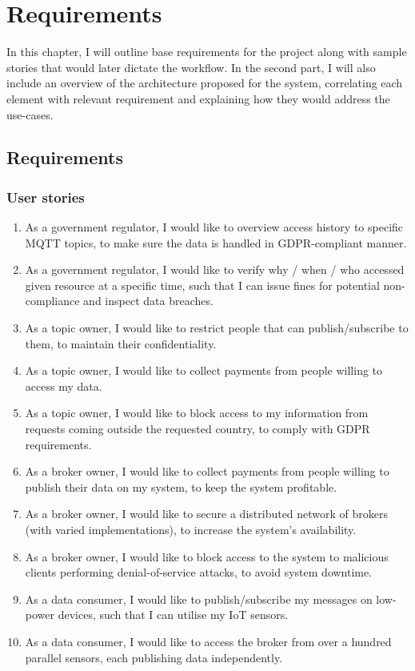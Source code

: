 \chapter{Requirements}
In this chapter, I will outline base requirements for the project along with sample stories that would later dictate the workflow. In the second part, I will also include an overview of the architecture proposed for the system, correlating each element with relevant requirement and explaining how they would address the use-cases.

\section{Requirements}

\subsection{User stories}

\begin{enumerate}
\item As a government regulator, I would like to overview access history to specific MQTT topics, to make sure the data is handled in GDPR-compliant manner.
\item As a government regulator, I would like to verify why / when / who accessed given resource at a specific time, such that I can issue fines for potential non-compliance and inspect data breaches.
\item As a topic owner, I would like to restrict people that can publish/subscribe to them, to maintain their confidentiality.
\item As a topic owner, I would like to collect payments from people willing to access my data.
\item As a topic owner, I would like to block access to my information from requests coming outside the requested country, to comply with GDPR requirements.
\item As a broker owner, I would like to collect payments from people willing to publish their data on my system, to keep the system profitable.
\item As a broker owner, I would like to secure a distributed network of brokers (with varied implementations), to increase the system's availability. 
\item As a broker owner, I would like to block access to the system to malicious clients performing denial-of-service attacks, to avoid system downtime.
\item As a data consumer, I would like to publish/subscribe my messages on low-power devices, such that I can utilise my IoT sensors.
\item As a data consumer, I would like to access the broker from over a hundred parallel sensors, each publishing data independently.
\end{enumerate}

